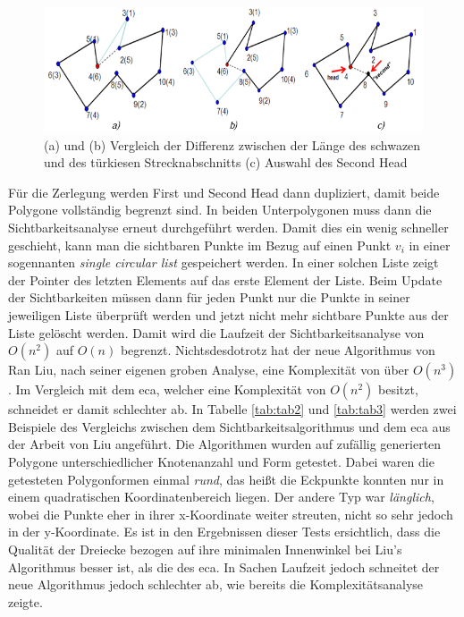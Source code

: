 \begin{figure}[h]
    \centering
    \includegraphics[width=1\textwidth]{bilder/second_head_comp.png}
    \caption[Test zur Auswahl des Second Head]{\centering(a) und (b) Vergleich der Differenz zwischen der Länge des schwazen und des türkiesen Strecknabschnitts (c) Auswahl des Second Head \cite{newAlg} }
    \label{fig:secHead}
\end{figure}

Für die Zerlegung werden First und Second Head dann dupliziert, damit beide Polygone vollständig begrenzt sind. In beiden Unterpolygonen muss dann die Sichtbarkeitsanalyse erneut durchgeführt werden.
Damit dies ein wenig schneller geschieht, kann man die sichtbaren Punkte im Bezug auf einen Punkt $v_i$ in einer sogennanten \emph{single circular list} gespeichert werden. In einer solchen Liste zeigt der Pointer des 
letzten Elements auf das erste Element der Liste. Beim Update der Sichtbarkeiten müssen dann für jeden Punkt nur die Punkte in seiner jeweiligen Liste überprüft werden und jetzt nicht mehr sichtbare Punkte aus der Liste 
gelöscht werden. Damit wird die Laufzeit der Sichtbarkeitsanalyse von $O(n^2)$ auf $O(n)$ begrenzt. Nichtsdesdotrotz hat der neue Algorithmus von Ran Liu, nach seiner eigenen groben Analyse, eine Komplexität von über $O(n^3)$.
Im Vergleich mit dem \ac{eca}, welcher eine Komplexität von $O(n^2)$ besitzt, schneidet er damit schlechter ab. In Tabelle \ref{tab:tab2} und \ref{tab:tab3} werden zwei Beispiele des Vergleichs zwischen dem Sichtbarkeitsalgorithmus 
und dem \ac{eca} aus der Arbeit von Liu angeführt. Die Algorithmen wurden auf zufällig generierten Polygone unterschiedlicher Knotenanzahl und Form getestet. Dabei waren die getesteten Polygonformen einmal \emph{rund}, das heißt 
die Eckpunkte konnten nur in einem quadratischen Koordinatenbereich liegen. Der andere Typ war \emph{länglich}, wobei die Punkte eher in ihrer x-Koordinate weiter streuten, nicht so sehr jedoch in der y-Koordinate.
Es ist in den Ergebnissen dieser Tests ersichtlich, dass die Qualität der Dreiecke bezogen auf ihre minimalen Innenwinkel bei Liu's Algorithmus besser ist, als die des \ac{eca}. In Sachen Laufzeit jedoch schneitet der neue Algorithmus jedoch schlechter ab,
wie bereits die Komplexitätsanalyse zeigte.

